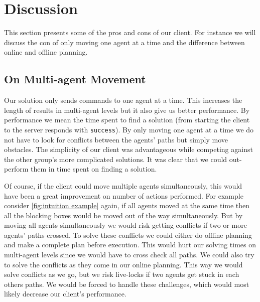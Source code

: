 \section{Discussion}
\label{sec:discussion}

This section presents some of the pros and cons of our client.
For instance we will discuss the con of only moving one agent at a time and the difference between online and offline planning.

\subsection{On Multi-agent Movement}
Our solution only sends commands to one agent at a time.
This increases the length of results in multi-agent levels but it also give us better performance.
By performance we mean the time spent to find a solution (from starting the client to the server responds with \texttt{success}).
By only moving one agent at a time we do not have to look for conflicts between the agents' paths but simply move obstacles.
The simplicity of our client was advantageous while competing against the other group's more complicated solutions.
It was clear that we could out-perform them in time spent on finding a solution.

Of course, if the client could move multiple agents simultaneously, this would have been a great improvement on number of actions performed.
For example consider \cref{fig:intuition example} again, if all agents moved at the same time then all the blocking boxes would be moved out of the way simultaneously.
But by moving all agents simultaneously we would risk getting conflicts if two or more agents' paths crossed.
To solve these conflicts we could either do offline planning and make a complete plan before execution.
This would hurt our solving times on multi-agent levels since we would have to cross check all paths.
We could also try to solve the conflicts as they come in our online planning.
This way we would solve conflicts as we go, but we risk live-locks if two agents get stuck in each others paths.
We would be forced to handle these challenges, which would most likely decrease our client's performance.


